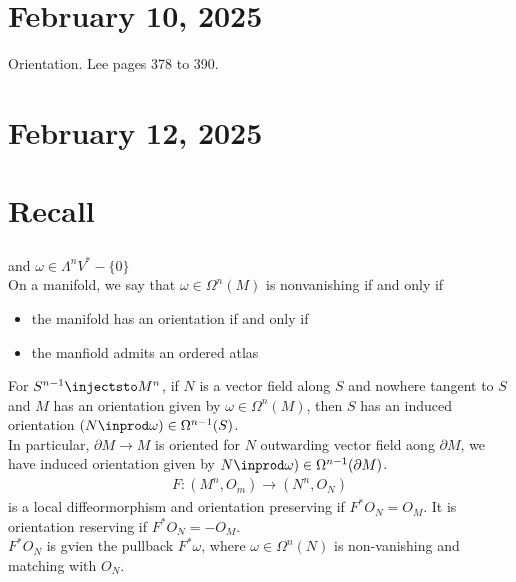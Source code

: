 \documentclass[11pt]{article}
\begin{document}
\section*{February 10, 2025}
\label{sec:org6fee874}
Orientation. Lee pages 378 to 390.\\
\section*{February 12, 2025}
\label{sec:orgf648689}
\section*{Recall}
\label{sec:orgd5dd204}
\begin{align*}
  [E_{1},E_{2},\ldots,E_{n}]
\end{align*}
and \(\omega\in\Lambda^{n}V^{*}-\{0\}\)\\
On a manifold, we say that \(\omega\in\Omega^{n}(M)\) is nonvanishing if and only if\\
\begin{itemize}
\item the manifold has an orientation if and only if\\
\item the manfiold admits an ordered atlas\\
\end{itemize}

For \(S^{n-1}\injectsto M^{n}\), if \(N\) is a vector field along \(S\) and nowhere tangent to \(S\) and \(M\) has an orientation given by \(\omega\in\Omega^{n}(M)\), then \(S\) has an induced orientation \((N\inprod\omega)\in\Omega^{n-1}(S)\).\\
In particular, \(\partial M\to M\) is oriented for \(N\) outwarding vector field aong \(\partial M\), we have induced orientation given by \(N\inprod\omega)\in\Omega^{n-1}(\partial M)\).\\
\begin{align*}
  F:(M^{n},O_{m})\to(N^{n},O_{N})
\end{align*}
is a local diffeormorphism and orientation preserving if \(F^{*}O_{N}=O_{M}\). It is orientation reserving if \(F^{*}O_{N}=-O_{M}\).\\
\(F^{*}O_{N}\) is gvien the pullback \(F^{*}\omega\), where \(\omega\in\Omega^{n}(N)\) is non-vanishing and matching with \(O_{N}\).\\
\end{document}
